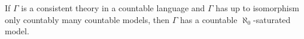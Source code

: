 \begin{corollary}[28.9]
\label{cor:countably-many-countable-models-implies-saturated}
If $\Gamma$ is a consistent theory in a countable language and $\Gamma$ has up to isomorphism only countably many countable models, then $\Gamma$ has a countable $\aleph_0$-saturated model.
\end{corollary}
